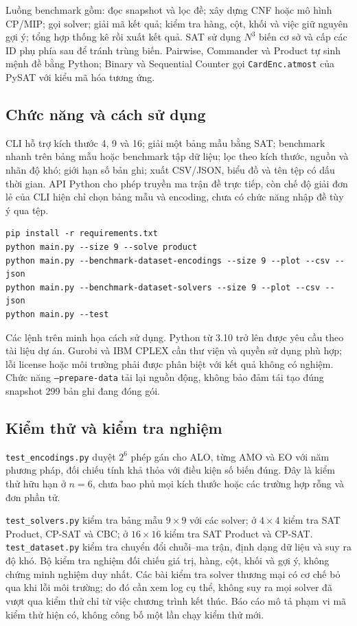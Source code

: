 \documentclass[a4paper,fleqn,nologo]{cas-sc}
\begin{document}
Luồng benchmark gồm: đọc snapshot và lọc đề; xây dựng CNF hoặc mô hình CP/MIP; gọi solver; giải mã kết quả; kiểm tra hàng, cột, khối và việc giữ nguyên gợi ý; tổng hợp thống kê rồi xuất kết quả. SAT sử dụng $N^3$ biến cơ sở và cấp các ID phụ phía sau để tránh trùng biến. Pairwise, Commander và Product tự sinh mệnh đề bằng Python; Binary và Sequential Counter gọi \texttt{CardEnc.atmost} của PySAT \cite{ignatiev2018pysat} với kiểu mã hóa tương ứng.

\subsection{Chức năng và cách sử dụng}
CLI hỗ trợ kích thước 4, 9 và 16; giải một bảng mẫu bằng SAT; benchmark nhanh trên bảng mẫu hoặc benchmark tập dữ liệu; lọc theo kích thước, nguồn và nhãn độ khó; giới hạn số bản ghi; xuất CSV/JSON, biểu đồ và tên tệp có dấu thời gian. API Python cho phép truyền ma trận đề trực tiếp, còn chế độ giải đơn lẻ của CLI hiện chỉ chọn bảng mẫu và encoding, chưa có chức năng nhập đề tùy ý qua tệp.
\begin{verbatim}
pip install -r requirements.txt
python main.py --size 9 --solve product
python main.py --benchmark-dataset-encodings --size 9 --plot --csv --json
python main.py --benchmark-dataset-solvers --size 9 --plot --csv --json
python main.py --test
\end{verbatim}
Các lệnh trên minh họa cách sử dụng. Python từ 3.10 trở lên được yêu cầu theo tài liệu dự án. Gurobi và IBM CPLEX cần thư viện và quyền sử dụng phù hợp; lỗi license hoặc môi trường phải được phân biệt với kết quả không có nghiệm. Chức năng \texttt{--prepare-data} tải lại nguồn động, không bảo đảm tái tạo đúng snapshot 299 bản ghi đang đóng gói.

\subsection{Kiểm thử và kiểm tra nghiệm}
\texttt{test\_encodings.py} duyệt $2^6$ phép gán cho ALO, từng AMO và EO với năm phương pháp, đối chiếu tính khả thỏa với điều kiện số biến đúng. Đây là kiểm thử hữu hạn ở $n=6$, chưa bao phủ mọi kích thước hoặc các trường hợp rỗng và đơn phần tử.

\texttt{test\_solvers.py} kiểm tra bảng mẫu $9\times9$ với các solver; ở $4\times4$ kiểm tra SAT Product, CP-SAT và CBC; ở $16\times16$ kiểm tra SAT Product và CP-SAT. \texttt{test\_dataset.py} kiểm tra chuyển đổi chuỗi--ma trận, định dạng dữ liệu và suy ra độ khó. Bộ kiểm tra nghiệm đối chiếu giá trị, hàng, cột, khối và gợi ý, không chứng minh nghiệm duy nhất. Các bài kiểm tra solver thương mại có cơ chế bỏ qua khi lỗi môi trường; do đó cần xem log cụ thể, không suy ra mọi solver đã vượt qua kiểm thử chỉ từ việc chương trình kết thúc. Báo cáo mô tả phạm vi mã kiểm thử hiện có, không công bố một lần chạy kiểm thử mới.
\end{document}
